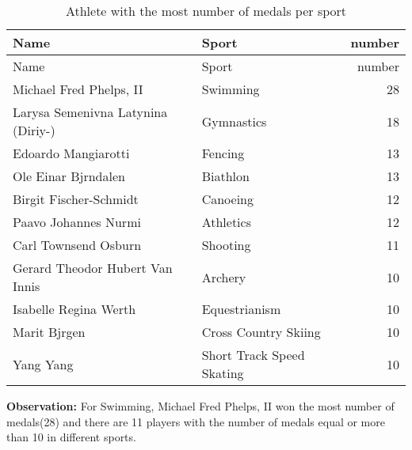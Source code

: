 \documentclass[
]{article}
\begin{document}
\begin{longtable}[]{@{}llr@{}}
\caption{Athlete with the most number of medals per
sport}\tabularnewline
\toprule
Name & Sport & number \\
\midrule
\endfirsthead
\toprule
Name & Sport & number \\
\midrule
\endhead
Michael Fred Phelps, II & Swimming & 28 \\
Larysa Semenivna Latynina (Diriy-) & Gymnastics & 18 \\
Edoardo Mangiarotti & Fencing & 13 \\
Ole Einar Bjrndalen & Biathlon & 13 \\
Birgit Fischer-Schmidt & Canoeing & 12 \\
Paavo Johannes Nurmi & Athletics & 12 \\
Carl Townsend Osburn & Shooting & 11 \\
Gerard Theodor Hubert Van Innis & Archery & 10 \\
Isabelle Regina Werth & Equestrianism & 10 \\
Marit Bjrgen & Cross Country Skiing & 10 \\
Yang Yang & Short Track Speed Skating & 10 \\
\bottomrule
\end{longtable}

\textbf{Observation:} For Swimming, Michael Fred Phelps, II won the most
number of medals(28) and there are 11 players with the number of medals
equal or more than 10 in different sports.
\end{document}

